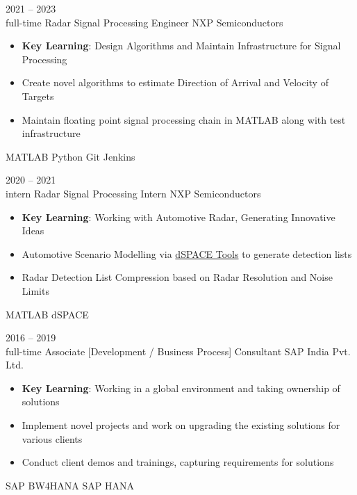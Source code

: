 \documentclass[9pt]{developercv} %
\begin{document}
\vspace{0.5cm}

\begin{center}
\end{center}

\vspace{0.5cm}



\begin{entrylist}
	\entry
		{2021 -- 2023\\\footnotesize{full-time}}
		{Radar Signal Processing Engineer}
		{NXP Semiconductors}
		{\begin{itemize}
			\itemsep-0.25em
			\item \textbf{Key Learning}: Design Algorithms and Maintain Infrastructure for Signal Processing
			\item Create novel algorithms to estimate Direction of Arrival and Velocity of Targets
			\item Maintain floating point signal processing chain in MATLAB along with test infrastructure
		\end{itemize}
		MATLAB\textsuperscript{\tiny\textregistered}\slashsep{}
		Python\slashsep{}
		Git\slashsep{}
		Jenkins}
	\entry
		{2020 -- 2021\\\footnotesize{intern}}
		{Radar Signal Processing Intern}
		{NXP Semiconductors}
		{\begin{itemize}
			\itemsep-0.25em
			\item \textbf{Key Learning}: Working with Automotive Radar, Generating Innovative Ideas
			\item Automotive Scenario Modelling via \href{https://www.dspace.com/en/inc/home.cfm}{dSPACE Tools} to generate detection lists
			\item Radar Detection List Compression based on Radar Resolution and Noise Limits
		\end{itemize}
		MATLAB\textsuperscript{\tiny\textregistered}\slashsep
		dSPACE\textsuperscript{\tiny\textregistered}}
	\entry
		{2016 -- 2019\\\footnotesize{full-time}}
		{Associate [Development / Business Process] Consultant}
		{SAP India Pvt. Ltd.}
		{\begin{itemize}
			\itemsep-0.25em
			\item \textbf{Key Learning}: Working in a global environment and taking ownership of solutions
			\item Implement novel projects and work on upgrading the existing solutions for various clients
			\item Conduct client demos and trainings, capturing requirements for solutions
		\end{itemize}
		SAP \textsuperscript{\tiny\textregistered} BW4HANA\slashsep
		SAP \textsuperscript{\tiny\textregistered} HANA}
\end{entrylist}
\end{document}
